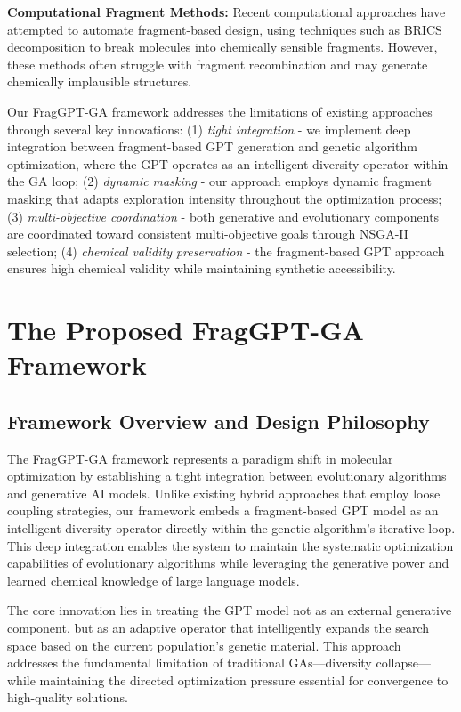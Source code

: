 \documentclass[lettersize,journal]{IEEEtran}
\begin{document}
\noindent \textbf{Computational Fragment Methods:} Recent computational approaches have attempted to automate fragment-based design, using techniques such as BRICS decomposition to break molecules into chemically sensible fragments. However, these methods often struggle with fragment recombination and may generate chemically implausible structures.

Our FragGPT-GA framework addresses the limitations of existing approaches through several key innovations: (1) \textit{tight integration} - we implement deep integration between fragment-based GPT generation and genetic algorithm optimization, where the GPT operates as an intelligent diversity operator within the GA loop; (2) \textit{dynamic masking} - our approach employs dynamic fragment masking that adapts exploration intensity throughout the optimization process; (3) \textit{multi-objective coordination} - both generative and evolutionary components are coordinated toward consistent multi-objective goals through NSGA-II selection; (4) \textit{chemical validity preservation} - the fragment-based GPT approach ensures high chemical validity while maintaining synthetic accessibility.



\section{The Proposed FragGPT-GA Framework}

\subsection{Framework Overview and Design Philosophy}

The FragGPT-GA framework represents a paradigm shift in molecular optimization by establishing a tight integration between evolutionary algorithms and generative AI models. Unlike existing hybrid approaches that employ loose coupling strategies, our framework embeds a fragment-based GPT model as an intelligent diversity operator directly within the genetic algorithm's iterative loop. This deep integration enables the system to maintain the systematic optimization capabilities of evolutionary algorithms while leveraging the generative power and learned chemical knowledge of large language models.

The core innovation lies in treating the GPT model not as an external generative component, but as an adaptive operator that intelligently expands the search space based on the current population's genetic material. This approach addresses the fundamental limitation of traditional GAs—diversity collapse—while maintaining the directed optimization pressure essential for convergence to high-quality solutions.
\end{document}
